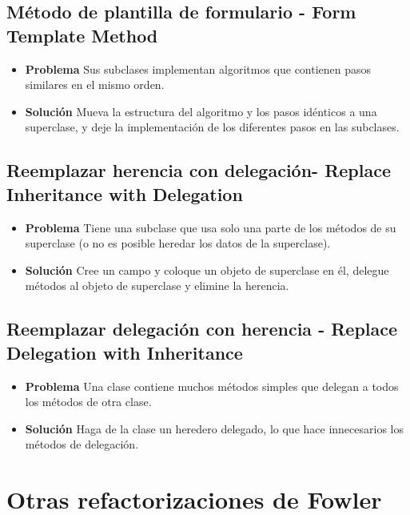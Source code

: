 \documentclass[11pt,a4paper,oneside]{book}
\begin{document}
\subsection{Método de plantilla de formulario - Form Template Method}
\label{renombrarmetodo}
\begin{itemize}
    \item \textbf{Problema} Sus subclases implementan algoritmos que contienen pasos similares en el mismo orden.
    \item \textbf{Solución}  Mueva la estructura del algoritmo y los pasos idénticos a una superclase, y deje la implementación de los diferentes pasos en las subclases.
\end{itemize}

\subsection{Reemplazar herencia con delegación- Replace Inheritance with Delegation}
\label{renombrarmetodo}
\begin{itemize}
    \item \textbf{Problema} Tiene una subclase que usa solo una parte de los métodos de su superclase (o no es posible heredar los datos de la superclase).
    \item \textbf{Solución} Cree un campo y coloque un objeto de superclase en él, delegue métodos al objeto de superclase y elimine la herencia.
\end{itemize}

\subsection{Reemplazar delegación con herencia - Replace Delegation with Inheritance}
\label{renombrarmetodo}
\begin{itemize}
    \item \textbf{Problema} Una clase contiene muchos métodos simples que delegan a todos los métodos de otra clase.
    \item \textbf{Solución} Haga de la clase un heredero delegado, lo que hace innecesarios los métodos de delegación.
\end{itemize}




\section{Otras refactorizaciones de Fowler}
\end{document}
